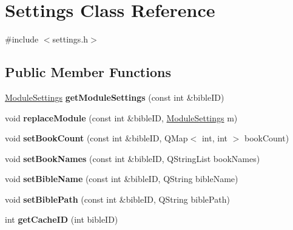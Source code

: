\hypertarget{classSettings}{
\section{Settings Class Reference}
\label{classSettings}
}


{\ttfamily \#include $<$settings.h$>$}

\subsection*{Public Member Functions}
\begin{DoxyCompactItemize}
\item 
\hypertarget{classSettings_a823da407a40ae2fbe3031538cf498472}{
\hyperlink{classModuleSettings}{ModuleSettings} {\bfseries getModuleSettings} (const int \&bibleID)}
\label{classSettings_a823da407a40ae2fbe3031538cf498472}

\item 
\hypertarget{classSettings_a87353d9e5ca7e452c222b14772f8508b}{
void {\bfseries replaceModule} (const int \&bibleID, \hyperlink{classModuleSettings}{ModuleSettings} m)}
\label{classSettings_a87353d9e5ca7e452c222b14772f8508b}

\item 
\hypertarget{classSettings_a1a2648f466694632ffe5eb7df750bd90}{
void {\bfseries setBookCount} (const int \&bibleID, QMap$<$ int, int $>$ bookCount)}
\label{classSettings_a1a2648f466694632ffe5eb7df750bd90}

\item 
\hypertarget{classSettings_a3468c250761c7db0e4b61f9e67ecb079}{
void {\bfseries setBookNames} (const int \&bibleID, QStringList bookNames)}
\label{classSettings_a3468c250761c7db0e4b61f9e67ecb079}

\item 
\hypertarget{classSettings_a9733ed2848412829c96150f8d3cdbd55}{
void {\bfseries setBibleName} (const int \&bibleID, QString bibleName)}
\label{classSettings_a9733ed2848412829c96150f8d3cdbd55}

\item 
\hypertarget{classSettings_a9abc0c2e1e4558e42318b041bb691dea}{
void {\bfseries setBiblePath} (const int \&bibleID, QString biblePath)}
\label{classSettings_a9abc0c2e1e4558e42318b041bb691dea}

\item 
\hypertarget{classSettings_a36a9eb5b9a02bcd8f2e28f944162992a}{
int {\bfseries getCacheID} (int bibleID)}
\label{classSettings_a36a9eb5b9a02bcd8f2e28f944162992a}


\end{DoxyCompactItemize}
